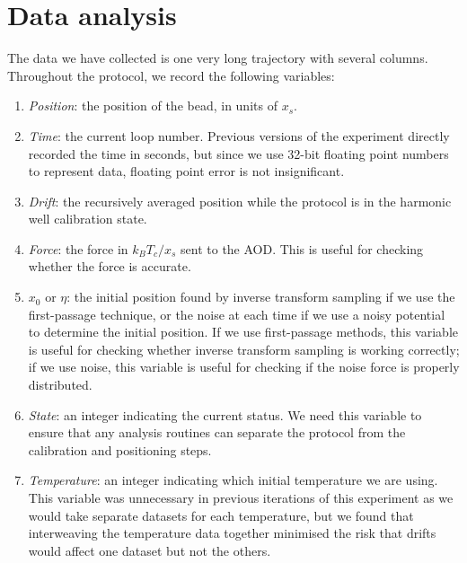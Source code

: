 \documentclass[hyperref={colorlinks=true, urlcolor=blue, citecolor=blue, final, bound}]{sfuthesis}
\begin{document}
\section{Data analysis}
The data we have collected is one very long trajectory with several columns.
Throughout the protocol, we record the following variables:
\begin{enumerate}
    \item \textit{Position}: the position of the bead, in units of $x_s$.
    \item \textit{Time}: the current loop number. Previous versions of the experiment directly recorded the time in seconds, but since we use 32-bit floating point numbers to represent data, floating point error is not insignificant.
    \item \textit{Drift}: the recursively averaged position while the protocol is in the harmonic well calibration state.
    \item \textit{Force}: the force in $k_BT_c/x_s$ sent to the AOD. This is useful for checking whether the force is accurate.
    \item \textit{$x_0$} or \textit{$\eta$}: the initial position found by inverse transform sampling if we use the first-passage technique, or the noise at each time if we use a noisy potential to determine the initial position. If we use first-passage methods, this variable is useful for checking whether inverse transform sampling is working correctly; if we use noise, this variable is useful for checking if the noise force is properly distributed.
    \item \textit{State}: an integer indicating the current status. We need this variable to ensure that any analysis routines can separate the protocol from the calibration and positioning steps.
    \item \textit{Temperature}: an integer indicating which initial temperature we are using. This variable was unnecessary in previous iterations of this experiment as we would take separate datasets for each temperature, but we found that interweaving the temperature data together minimised the risk that drifts would affect one dataset but not the others.
\end{enumerate}
\end{document}
